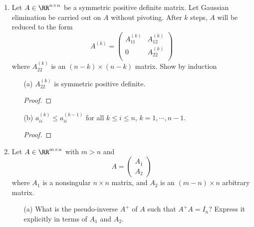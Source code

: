 \documentclass[11pt]{article}
\begin{document}
\begin{enumerate}
\begin{enumerate}
            \item[(b)]

            \item[(c)]  

        \end{enumerate}


    \item %
        Let $A \in \RR^{n \times n}$ be a symmetric positive definite matrix.
        Let Gaussian elimination be carried out on $A$ without pivoting.
        After $k$ steps, $A$ will be reduced to the form
        \[
            A^{(k)} =
            \begin{pmatrix}
                A_{11}^{(k)} & A_{12}^{(k)} \\
                0            & A_{22}^{(k)} \\
            \end{pmatrix}
        \]
        where $A_{22}^{(k)}$ is an $(n - k) \times (n - k)$ matrix.
        Show by induction
        \begin{enumerate}
            \item[(a)]
                $A_{22}^{(k)}$ is symmetric positive definite.

                \begin{proof}
                    
                \end{proof}

            \item[(b)]
                $a_{ii}^{(k)} \le a_{ii}^{(k-1)}$ for all $k \le i \le n$,
                $k = 1, \cdots, n - 1$.

                \begin{proof}
                    
                \end{proof}
        \end{enumerate}

    \item %
        Let $A \in \RR^{m \times n}$ with $m > n$ and
        \[
            A = 
            \begin{pmatrix}
                A_1 \\
                A_2
            \end{pmatrix}
        \]
        where $A_1$ is a nonsingular $n \times n$ matrix, and $A_2$ is an
        $(m - n) \times n$ arbitrary matrix.
        \begin{enumerate}
            \item[(a)] %
                What is the pseudo-inverse $A^+$ of $A$ such that $A^+ A = I_n$?
                Express it explicitly in terms of $A_1$ and $A_2$.


\end{enumerate}
\end{enumerate}
\end{document}

